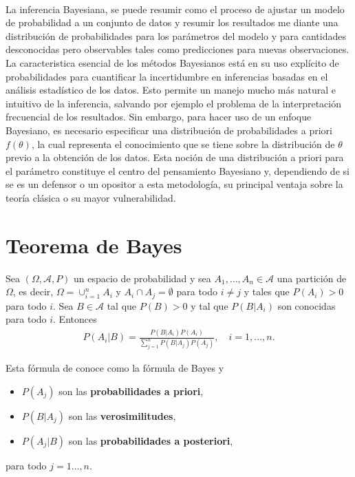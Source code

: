 \\
\newline
La inferencia Bayesiana, se puede resumir como el proceso de ajustar un modelo de probabilidad a un conjunto de datos y resumir los resultados me diante una distribución de probabilidades para los parámetros del modelo y para cantidades desconocidas pero observables tales como predicciones para nuevas observaciones. La caracteristica esencial de los métodos Bayesianos está en su uso explícito de probabilidades para cuantificar la incertidumbre en inferencias basadas en el análisis estadístico de los datos. Esto permite un manejo mucho más natural e intuitivo de la inferencia, salvando por ejemplo el problema de la interpretación frecuencial de los resultados. Sin embargo, para hacer uso de un enfoque Bayesiano, es necesario especificar una distribución de probabilidades a priori $f(\theta)$, la cual representa el conocimiento que se tiene sobre la distribución de $\theta$ previo a la obtención de los datos. Esta noción de una distribución a priori para el parámetro constituye el centro del pensamiento Bayesiano y, dependiendo de si se es un defensor o un opositor a esta metodología, su principal ventaja sobre la teoría clásica o su mayor vulnerabilidad.

\section{Teorema de Bayes}

\begin{teo}[de Bayes]
    Sea $(\Omega, \mathcal{A}, P)$ un espacio de probabilidad y sea $A_1, \ldots, A_n \in \mathcal{A}$ una partición de $\Omega$, es decir, $\Omega = \cup_{i=1}^{n} A_i$ y $A_i \cap A_j = \emptyset$ para todo $i \not = j$ y tales que $P(A_i) > 0$ para todo $i$. Sea $B \in \mathcal{A}$ tal que $P(B) > 0$ y tal que  $P(B | A_i)$ son conocidas para todo $i$. Entonces
    \begin{align*}
        P(A_i | B) = \frac{P(B|A_i)P(A_i)}{\sum_{j=1}^{n} P(B|A_j)P(A_j)}, \quad i=1, \ldots,n.
    \end{align*}
\end{teo}
Esta fórmula de conoce como la fórmula de Bayes y 
\begin{itemize}
    \item $P(A_j)$ son las \textbf{probabilidades a priori},
    \item $P(B|A_j)$ son las \textbf{verosimilitudes},
    \item $P(A_j|B)$ son las \textbf{probabilidades a posteriori},
\end{itemize}
para todo $j=1 \ldots, n$.

